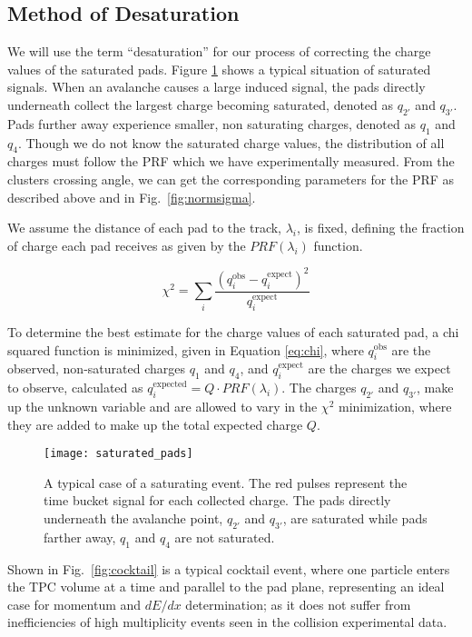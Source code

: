 \subsection{Method of Desaturation}
We will use the term ``desaturation'' for our process of correcting the charge values of the saturated pads. Figure \ref{fig:satpad} shows a typical situation of saturated signals. When an avalanche causes a large induced signal, the pads directly underneath collect the largest charge becoming saturated, denoted as $q_{2'}$ and $q_{3'}$. Pads further away experience smaller, non saturating charges, denoted as $q_{1}$ and $q_{4}$. Though we do not know the saturated charge values, the distribution of all charges must follow the PRF which we have experimentally measured. From the clusters crossing angle, we can get the corresponding parameters for the PRF as described above and in Fig.~\ref{fig:normsigma}.

We assume the distance of each pad to the track, $\lambda_i$, is fixed, defining the fraction of charge each pad receives as given by the $PRF(\lambda_i)$ function. 


\begin{equation}\label{eq:chi}
\chi^2 = \sum_i \frac{(q_i^{\mathrm{obs}} - q_i^{\mathrm{expect}})^2}{q_i^{\mathrm{expect}}}
\end{equation}

To determine the best estimate for the charge values of each saturated pad, a chi squared function is minimized, given in  Equation \ref{eq:chi}, where $q_i^{\mathrm{obs}}$ are the observed, non-saturated charges $q_{1}$ and $q_{4}$, and $q_i^{\mathrm{expect}}$ are the charges we expect to observe, calculated as $q_i^{\mathrm{expected}} = Q\cdot PRF(\lambda_i)$. The charges $q_{2'}$ and $q_{3'}$, make up the unknown variable and are allowed to vary in the $\chi^2$ minimization, where they are added to make up the total expected charge $Q$.


\begin{figure}[ht!]
\texttt{[image: saturated\_pads]}
\caption{A typical case of a saturating event. The red pulses represent the time bucket signal for each collected charge. The pads directly underneath the avalanche point, $q_{2'}$ and $q_{3'}$, are saturated while pads farther away, $q_1$ and $q_4$ are not saturated.}
\label{fig:satpad}
\end{figure}

Shown in Fig.~\ref{fig:cocktail} is a typical cocktail event, where one particle enters the TPC volume at a time and parallel to the pad plane, representing an ideal case for momentum and $dE/dx$ determination; as it does not suffer from inefficiencies of high multiplicity events seen in the collision experimental data.  

